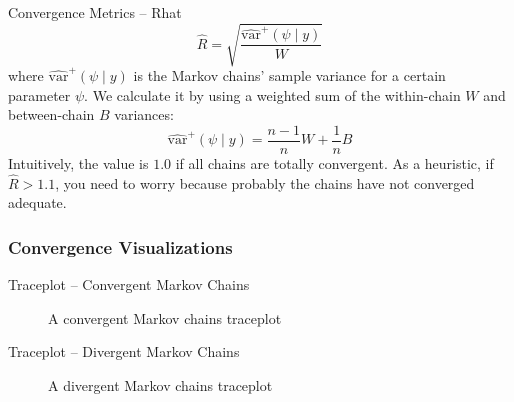 \begin{frame}{Convergence Metrics -- Rhat \parencite{gelman2013bayesian}}
    $$\widehat{R} = \sqrt{\frac{\widehat{\text{var}}^+(\psi \mid y)}{W}}$$
    where $\widehat{\text{var}}^+(\psi \mid y)$ is the Markov chains' sample variance
    for a certain parameter $\psi$.
    We calculate it by using a weighted sum of the within-chain $W$
    and between-chain $B$ variances:
    $$\widehat{\text{var}}^+(\psi \mid y) = \frac{n-1}{n} W + \frac{1}{n} B$$
    \vfill
    Intuitively, the value is $1.0$ if all chains are totally convergent.
    As a heuristic, if $\widehat{R} > 1.1$,
    you need to worry because probably the chains have not converged adequate.
\end{frame}

\subsubsection{Convergence Visualizations}
\begin{frame}{Traceplot -- Convergent Markov Chains}
    \begin{figure}
        \centering
        \resizebox{.4\linewidth}{!}{}
        \caption{A convergent Markov chains traceplot}
    \end{figure}
\end{frame}

\begin{frame}{Traceplot -- Divergent Markov Chains}
    \begin{figure}
        \centering
        \resizebox{.4\linewidth}{!}{}
        \caption{A divergent Markov chains traceplot}
    \end{figure}
\end{frame}

